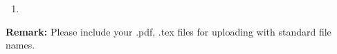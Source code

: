\documentclass[12pt,a4paper]{article}
\makeatletter
\newtheorem*{solution}{Solution}
\theoremstyle{definition}
\renewenvironment{solution}[1][Solution] {\par\pushQED{\qed}\normalfont\topsep6\p@\@plus6\p@\relax\trivlist\item[\hskip\labelsep\bfseries#1\@addpunct{.}]\ignorespaces}{\popQED\endtrivlist\@endpefalse} \makeatother
\makeatother
\begin{document}
\begin{enumerate}
\begin{solution}
	
	\end{solution}
    
    
    
\end{enumerate}

\textbf{Remark:} Please include your .pdf, .tex files for uploading with standard file names.
\newpage


\end{document}
